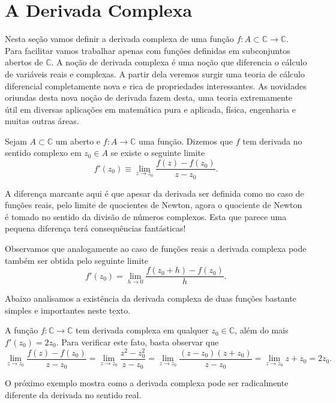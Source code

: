 \section{A Derivada Complexa}

Nesta seção vamos definir a derivada complexa de uma função $f:A\subset\mathbb{C}\to\mathbb{C}$.
Para facilitar vamos trabalhar apenas com funções definidas em subconjuntos abertos de $\mathbb{C}$.
A noção de derivada complexa é uma noção que diferencia o cálculo de variáveis reais e complexas.
A partir dela veremos surgir uma teoria de cálculo diferencial completamente nova e rica de propriedades
interessantes. As novidades oriundas desta nova noção de derivada 
fazem desta, uma teoria extremamente útil em diversas aplicações em matemática pura e aplicada, 
física, engenharia e muitas outras áreas.

\begin{definicao}\label{def-derivada-complexa}
Sejam $A\subset\mathbb{C}$ um aberto e $f:A\to\mathbb{C}$ uma função. Dizemos que $f$
tem derivada no sentido complexo em $z_0\in A$ se existe o seguinte limite 
\[
f'(z_0) \equiv \lim_{z\to z_0} \frac{f(z)-f(z_0)}{z-z_0}.
\]
\end{definicao}

A diferença marcante aqui é que apesar da derivada ser definida como no caso de funções reais,
pelo limite de quocientes de Newton, agora o quociente de Newton é tomado no sentido da divisão 
de números complexos. Esta que parece uma pequena diferença terá consequências fantásticas!

Observamos que analogamente ao caso de funções reais a derivada complexa
pode também ser obtida  pelo seguinte limite 
\[
f'(z_0) = \lim_{h\to 0} \frac{f(z_0+h)-f(z_0)}{h}.
\]

Abaixo analisamos a existência da derivada complexa de duas funções bastante simples e importantes
neste texto.

\begin{exemplo}
A função $f:\mathbb{C}\to\mathbb{C}$ tem derivada complexa em qualquer $z_0\in\mathbb{C}$, além do mais
$f'(z_0)=2z_0$. 
Para verificar este fato, basta observar que 
\[
\lim_{z\to z_0}\frac{ f(z)-f(z_0)}{z-z_0} 
=
\lim_{z\to z_0} \frac{z^2-z_0^2}{z-z_0}
=
\lim_{z\to z_0} \frac{(z-z_0)(z+z_0)}{z-z_0}
=
\lim_{z\to z_0} z+z_0
=
2z_0.
\]
\end{exemplo}
 
O próximo exemplo mostra como a derivada complexa pode ser radicalmente diferente da derivada 
no sentido real. 

